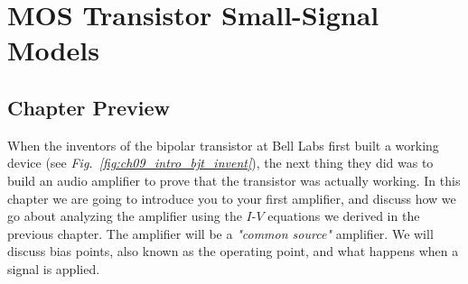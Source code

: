 \chapter{MOS Transistor Small-Signal Models}
\label{ch:ch09_mos_ss_dc}
\graphicspath{{./figures/figs_ch09_mos_ss_dc/}}
\section{Chapter Preview}
When the inventors of the bipolar transistor at Bell Labs first built a working device (see \emph{Fig.~\ref{fig:ch09_intro_bjt_invent}}), the next thing they did was to build an audio amplifier to prove that the transistor was actually working.  In this chapter we are going to introduce you to your first amplifier, and discuss how we go about analyzing the amplifier using the $I$-$V$ equations we derived in the previous chapter.  The amplifier will be a \emph{"common source"} amplifier.  We will discuss bias points, also known as the operating point, and what happens when a signal is applied.

